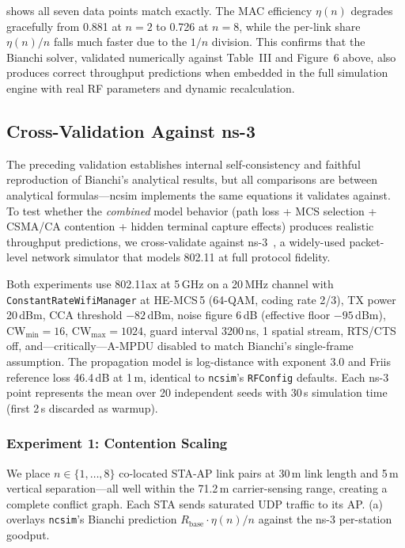 \documentclass[conference]{IEEEtran}
\newcommand{\ncsim}{\texttt{ncsim}}
\begin{document}
 shows all seven data points match exactly.  The MAC
efficiency $\eta(n)$ degrades gracefully from 0.881 at $n{=}2$ to 0.726 at
$n{=}8$, while the per-link share $\eta(n)/n$ falls much faster due to the
$1/n$ division.  This confirms that the Bianchi solver, validated
numerically against Table~III and Figure~6 above, also produces correct
throughput predictions when embedded in the full simulation engine with
real RF parameters and dynamic recalculation.


\subsection{Cross-Validation Against ns-3}
\label{sec:ns3_validation}

The preceding validation establishes internal self-consistency and faithful
reproduction of Bianchi's analytical results, but all comparisons are between
analytical formulas---ncsim implements the same equations it validates against.
To test whether the \emph{combined} model behavior (path loss + MCS selection +
CSMA/CA contention + hidden terminal capture effects) produces realistic
throughput predictions, we cross-validate against ns-3~\cite{ns3}, a
widely-used packet-level network simulator that models 802.11 at full protocol
fidelity.

Both experiments use 802.11ax at 5\,GHz on a 20\,MHz channel with
\texttt{ConstantRateWifiManager} at HE-MCS\,5 (64-QAM, coding rate 2/3),
TX power 20\,dBm, CCA threshold $-82$\,dBm, noise figure 6\,dB (effective
floor $-95$\,dBm), CW$_{\min}{=}16$, CW$_{\max}{=}1024$, guard interval
3200\,ns, 1 spatial stream, RTS/CTS off, and---critically---A-MPDU disabled to
match Bianchi's single-frame assumption.  The propagation model is
log-distance with exponent 3.0 and Friis reference loss 46.4\,dB at 1\,m,
identical to \ncsim{}'s \texttt{RFConfig} defaults.  Each ns-3 point
represents the mean over 20 independent seeds with 30\,s simulation time
(first 2\,s discarded as warmup).

\subsubsection{Experiment 1: Contention Scaling}

We place $n \in \{1, \ldots, 8\}$ co-located STA-AP link pairs at 30\,m
link length and 5\,m vertical separation---all well within the 71.2\,m
carrier-sensing range, creating a complete conflict graph.  Each STA sends
saturated UDP traffic to its AP.  (a) overlays
\ncsim{}'s Bianchi prediction $R_{\text{base}} \cdot \eta(n)/n$ against the
ns-3 per-station goodput.
\end{document}
